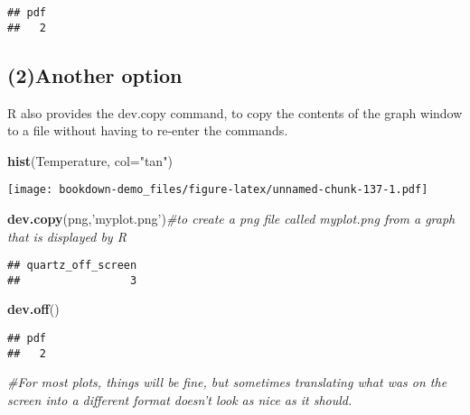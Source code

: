 \documentclass[]{book}
\newenvironment{Shaded}{\begin{snugshade}}{\end{snugshade}}
\newcommand{\KeywordTok}[1]{\textcolor[rgb]{0.13,0.29,0.53}{\textbf{#1}}}
\newcommand{\DataTypeTok}[1]{\textcolor[rgb]{0.13,0.29,0.53}{#1}}
\newcommand{\StringTok}[1]{\textcolor[rgb]{0.31,0.60,0.02}{#1}}
\newcommand{\CommentTok}[1]{\textcolor[rgb]{0.56,0.35,0.01}{\textit{#1}}}
\newcommand{\NormalTok}[1]{#1}
\theoremstyle{definition}
\theoremstyle{definition}
\theoremstyle{definition}
\theoremstyle{remark}
\begin{document}
\begin{verbatim}
## pdf 
##   2
\end{verbatim}

\subsection{(2)Another option}\label{another-option}

R also provides the dev.copy command, to copy the contents of the graph
window to a file without having to re-enter the commands.

\begin{Shaded}
\begin{Highlighting}[]
\KeywordTok{hist}\NormalTok{(Temperature, }\DataTypeTok{col=}\StringTok{"tan"}\NormalTok{)}
\end{Highlighting}
\end{Shaded}

\texttt{[image: bookdown-demo\_files/figure-latex/unnamed-chunk-137-1.pdf]}

\begin{Shaded}
\begin{Highlighting}[]
\KeywordTok{dev.copy}\NormalTok{(png,}\StringTok{'myplot.png'}\NormalTok{)}\CommentTok{#to create a png file called myplot.png from a graph that is displayed by R}
\end{Highlighting}
\end{Shaded}

\begin{verbatim}
## quartz_off_screen 
##                 3
\end{verbatim}

\begin{Shaded}
\begin{Highlighting}[]
\KeywordTok{dev.off}\NormalTok{()}
\end{Highlighting}
\end{Shaded}

\begin{verbatim}
## pdf 
##   2
\end{verbatim}

\begin{Shaded}
\begin{Highlighting}[]
\CommentTok{#For most plots, things will be fine, but sometimes translating what was on the screen into a different format doesn't look as nice as it should.}
\end{Highlighting}
\end{Shaded}
\end{document}
